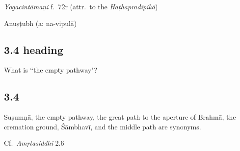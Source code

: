 \begin{ekdosis}
\begin{sources}[hp03_003]
\end{sources}

\begin{testimonia}[hp03_003]
\emph{Yogacintāmaṇi} f.~72r (attr.~to the \emph{Haṭhapradīpikā})

\begin{versinnote}
\end{versinnote}

\end{testimonia}


\begin{metre}[hp03_003]
Anuṣṭubh (a: na-vipulā)
\end{metre}

\subsection*{3.4 heading}
\begin{translation}[hp03_004a]
What is ``the empty pathway"?
\end{translation}


\subsection*{3.4}
\begin{translation}[hp03_004]
Suṣumṇā, the empty pathway, the great path to the aperture of Brahmā, the cremation ground, Śāmbhavī, and the middle path are synonyms.
\end{translation}

\begin{sources}[hp03_004]
Cf.~\emph{Amṛtasiddhi} 2.6
\begin{versinnote}
\end{versinnote}


\end{sources}
\end{ekdosis}
